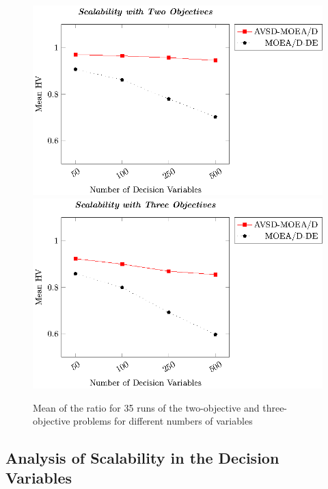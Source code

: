 \begin{figure}[t]
\centering
\includegraphics[scale=0.7]{images/Graphic-Scalability-2obj_tikz-figure0.eps}
\includegraphics[scale=0.7]{images/Graphic-Scalability-3obj_tikz-figure0.eps}
\caption{Mean of the \HV{} ratio for 35 runs of the two-objective and three-objective problems for different numbers of variables}\label{fig:scalability}
\end{figure}


\subsection{Analysis of Scalability in the Decision Variables}

